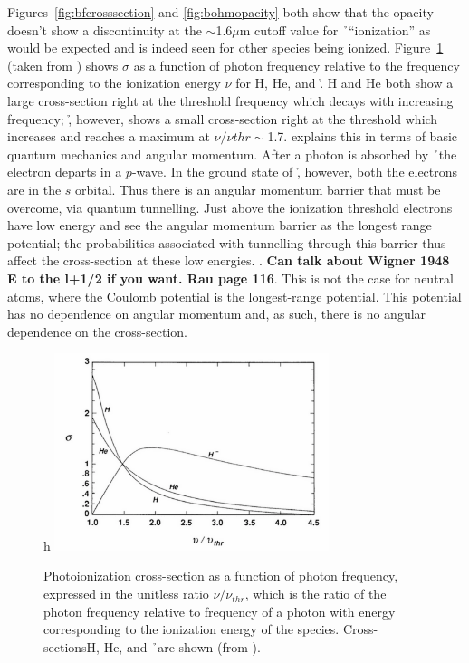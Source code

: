 Figures~\ref{fig:bfcrosssection} and \ref{fig:bohmopacity} both show that the opacity doesn't show a discontinuity at the $\sim$1.6$\mu$m cutoff value for \h\ ``ionization'' as would be expected and is indeed seen for other species being ionized.  Figure~\ref{fig:bethe} (taken from \citealt{bethe1977}) shows $\sigma$ as a function of photon frequency relative to the frequency corresponding to the ionization energy $\nu$ for H, He, and \h.  H and He both show a large cross-section right at the threshold frequency which decays with increasing frequency; \h, however, shows a small cross-section right at the threshold which increases and reaches a maximum at $\nu/\nu{thr}\sim$1.7.  \cite{rau1996} explains this in terms of basic quantum mechanics and angular momentum.  After a photon is absorbed by \h\ the electron departs in a $p$-wave.  In the ground state of \h, however, both the electrons are in the $s$ orbital.  Thus there is an angular momentum barrier that must be overcome, via quantum tunnelling.  Just above the ionization threshold electrons have low energy and see the angular momentum barrier as the longest range potential; the probabilities associated with tunnelling through this barrier thus affect the cross-section at these low energies. .  {\bf Can talk about Wigner 1948 E to the l+1/2 if you want. Rau page 116}.  This is not the case for neutral atoms, where the Coulomb potential is the longest-range potential.  This potential has no dependence on angular momentum and, as such, there is no angular dependence on the cross-section.
\begin{figure}{h}
\includegraphics[width=80mm]{figs/betheplot.png}
\caption{\label{fig:bethe}Photoionization cross-section as a function of photon frequency, expressed in the unitless ratio $\nu/\nu_{thr}$, which is the ratio of the photon frequency relative to frequency of a photon with energy corresponding to the ionization energy of the species.  Cross-sectionsH, He, and \h\ are shown (from \citealt{bethe1977}).}
\end{figure}

